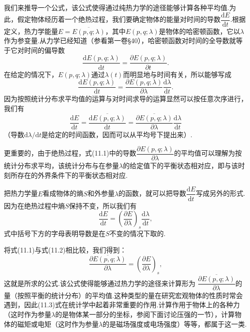 我们来推导一个公式，该公式使得通过纯热力学的途径能够计算各种平均值.为此，假定物体经历着一个绝热过程，我们要确定物体的能量对时间的导数$\dfrac{\mathrm{d}E}{\mathrm{d}t}$.根据定义，热力学能量$E=\overline{E(p,q;\lambda)}$，其中$E(p,q;\lambda)$是物体的哈密顿函数，它以$\lambda$作为参变量.从力学已经知道（参看第一卷§40），哈密顿函数对时间的全导数就等于它对时间的偏导数
\begin{equation*}
  \frac{\mathrm{d}E(p,q;\lambda)}{\mathrm{d}t}
  =\frac{\partial E(p,q;\lambda)}{\partial t}.
\end{equation*}
在给定的情况下，$E(p,q;\lambda)$通过$\lambda(t)$而明显地与时间有关，所以能够写成
\begin{equation*}
  \frac{\mathrm{d}E(p,q;\lambda)}{\mathrm{d}t}
  =\frac{\partial E(p,q;\lambda)}{\partial\lambda}
  \frac{\mathrm{d}\lambda}{\mathrm{d}t}.
\end{equation*}
因为按照统计分布求平均值的运算与对时间求导的运算显然可以按任意次序进行，我们有
\begin{equation}
  \frac{\mathrm{d}E}{\mathrm{d}t}
  =\overline{\frac{\mathrm{d}E(p,q;\lambda)}{\mathrm{d}t}}
  =\overline{\frac{\partial E(p,q;\lambda)}{\partial\lambda}}
  \frac{\mathrm{d}\lambda}{\mathrm{d}t}
\end{equation}
（导数$\mathrm{d}\lambda/\mathrm{d}t$是给定的时间函数，因而可以从平均号下提出来）.

更重要的，由于绝热过程，式(11.1)中的导数$\dfrac{\partial E(p,q;\lambda)}{\partial\lambda}$的平均值可以理解为按统计分布求平均，该统计分布与在参量$\lambda$的给定值下的平衡状态相对应，即与该时刻所存在的外界条件下的平衡状态相对应.

把热力学量$E$看成物体的熵$S$和外参量$\lambda$的函数，就可以把导数$\dfrac{\mathrm{d}E}{\mathrm{d}t}$写成另外的形式.因为在绝热过程中熵$S$保持不变，所以我们有
\begin{equation}
  \frac{\mathrm{d}E}{\mathrm{d}t}
  =\left(\frac{\partial E}{\partial\lambda}\right)_s
  \frac{\mathrm{d}\lambda}{\mathrm{d}t},
\end{equation}
式中括号下方的字母表明导数是在$S$不变的情况下取的.

将式(11.1)与式(11.2)相比较，我们得到：
\begin{equation}
  \overline{\frac{\partial E(p,q;\lambda)}{\partial\lambda}}
  =\left(\frac{\partial E}{\partial\lambda}\right)_s,
\end{equation}
这就是所求的公式.该公式使得能够通过热力学的途径来计算形为
$\overline{\dfrac{\partial E(p,q;\lambda)}{\partial\lambda}}$的量（按照平衡的统计分布）的平均值.这种类型的量在研究宏观物体的性质时常会遇到，因此(11.3)式在统计学中起着非常重要的作用.计算作用于物体上的各种力（这时作为参量$\lambda$的是物体某一部分的坐标，参阅下面讨论压强的一节），计算物体的磁矩或电矩（这时作为参量$\lambda$的是磁场强度或电场强度）等等，都属于这一类.

